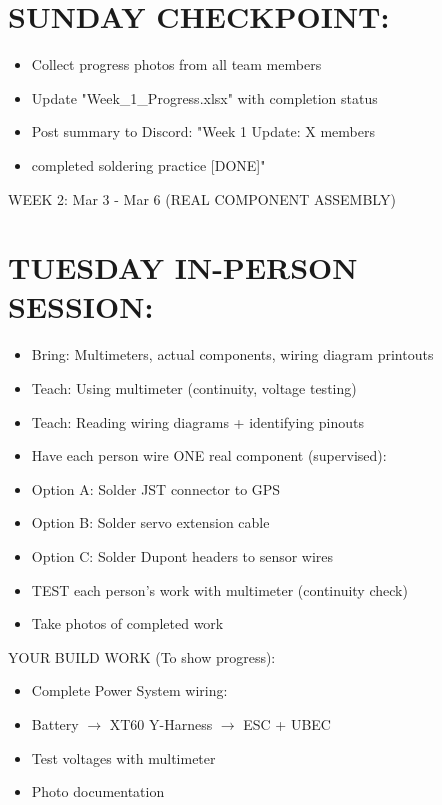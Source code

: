 \documentclass[11pt,letterpaper]{article}
\begin{document}
\section{SUNDAY CHECKPOINT:}

\begin{itemize}
  \item  [ ] Collect progress photos from all team members
  \item  [ ] Update "Week\_1\_Progress.xlsx" with completion status
  \item  [ ] Post summary to Discord: "Week 1 Update: X members
  \item completed soldering practice [DONE]"
\end{itemize}

WEEK 2: Mar 3 - Mar 6 (REAL COMPONENT ASSEMBLY)\par

\section{TUESDAY IN-PERSON SESSION:}

\begin{itemize}
  \item [WARNING]  [ ] Bring: Multimeters, actual components, wiring diagram printouts
  \item [WARNING]  [ ] Teach: Using multimeter (continuity, voltage testing)
  \item [WARNING]  [ ] Teach: Reading wiring diagrams + identifying pinouts
  \item [WARNING]  [ ] Have each person wire ONE real component (supervised):
  \item Option A: Solder JST connector to GPS
  \item Option B: Solder servo extension cable
  \item Option C: Solder Dupont headers to sensor wires
  \item [WARNING]  [ ] TEST each person's work with multimeter (continuity check)
  \item [WARNING]  [ ] Take photos of completed work
\end{itemize}

YOUR BUILD WORK (To show progress):\par

\begin{itemize}
  \item [CRITICAL] [ ] Complete Power System wiring:
  \item Battery $\rightarrow$ XT60 Y-Harness $\rightarrow$ ESC + UBEC
  \item Test voltages with multimeter
  \item Photo documentation
\end{itemize}
\end{document}
